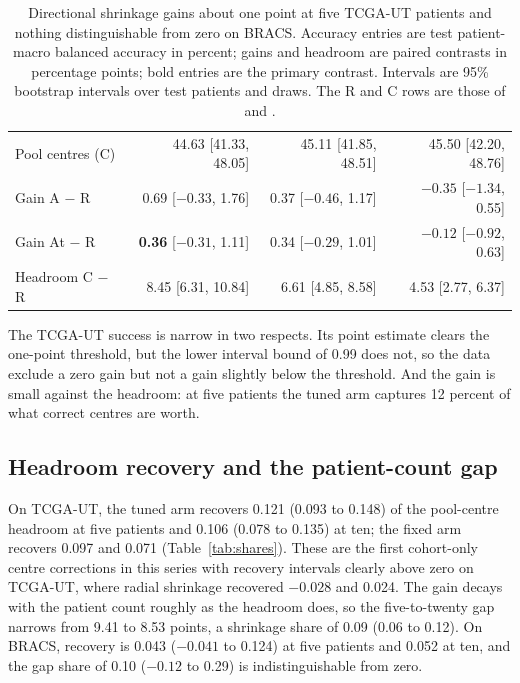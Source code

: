 \begin{table}[htbp]
\begin{tabular}{@{}lrrr@{}}
Pool centres (C) & 44.63 [41.33, 48.05] & 45.11 [41.85, 48.51] & 45.50 [42.20, 48.76] \\
\addlinespace
Gain A $-$ R & 0.69 [$-0.33$, 1.76] & 0.37 [$-0.46$, 1.17] & $-0.35$ [$-1.34$, 0.55] \\
Gain At $-$ R & \textbf{0.36} [$-0.31$, 1.11] & 0.34 [$-0.29$, 1.01] & $-0.12$ [$-0.92$, 0.63] \\
Headroom C $-$ R & 8.45 [6.31, 10.84] & 6.61 [4.85, 8.58] & 4.53 [2.77, 6.37] \\
\bottomrule
\end{tabular}
\caption{Directional shrinkage gains about one point at five TCGA-UT patients and nothing distinguishable from zero on BRACS. Accuracy entries are test patient-macro balanced accuracy in percent; gains and headroom are paired contrasts in percentage points; bold entries are the primary contrast. Intervals are 95\% bootstrap intervals over test patients and draws. The R and C rows are those of \citet{queisler2026centreError} and \citet{queisler2026bracsMechanism}.}
\label{tab:accuracy}
\end{table}

\noindent The TCGA-UT success is narrow in two respects. Its point estimate clears the one-point threshold, but the lower interval bound of 0.99 does not, so the data exclude a zero gain but not a gain slightly below the threshold. And the gain is small against the headroom: at five patients the tuned arm captures 12 percent of what correct centres are worth.

\subsection{Headroom recovery and the patient-count gap}
\label{sec:recovery-results}
On TCGA-UT, the tuned arm recovers 0.121 (0.093 to 0.148) of the pool-centre headroom at five patients and 0.106 (0.078 to 0.135) at ten; the fixed arm recovers 0.097 and 0.071 (Table~\ref{tab:shares}). These are the first cohort-only centre corrections in this series with recovery intervals clearly above zero on TCGA-UT, where radial shrinkage recovered $-0.028$ and 0.024. The gain decays with the patient count roughly as the headroom does, so the five-to-twenty gap narrows from 9.41 to 8.53 points, a shrinkage share of 0.09 (0.06 to 0.12). On BRACS, recovery is 0.043 ($-0.041$ to 0.124) at five patients and 0.052 at ten, and the gap share of 0.10 ($-0.12$ to 0.29) is indistinguishable from zero.

